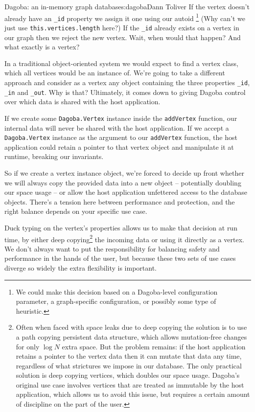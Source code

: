 \begin{aosachapter}{Dagoba: an in-memory graph database}{s:dagoba}{Dann Toliver}
If the vertex doesn't already have an \texttt{\_id} property we assign
it one using our autoid \footnote{We could make this decision based on a
  Dagoba-level configuration parameter, a graph-specific configuration,
  or possibly some type of heuristic.} (Why can't we just use
\texttt{this.vertices.length} here?) If the \texttt{\_id} already exists
on a vertex in our graph then we reject the new vertex. Wait, when would
that happen? And what exactly is a vertex?

In a traditional object-oriented system we would expect to find a vertex
class, which all vertices would be an instance of. We're going to take a
different approach and consider as a vertex any object containing the
three properties \texttt{\_id}, \texttt{\_in} and \texttt{\_out}. Why is
that? Ultimately, it comes down to giving Dagoba control over which data
is shared with the host application.

If we create some \texttt{Dagoba.Vertex} instance inside the
\texttt{addVertex} function, our internal data will never be shared with
the host application. If we accept a \texttt{Dagoba.Vertex} instance as
the argument to our \texttt{addVertex} function, the host application
could retain a pointer to that vertex object and manipulate it at
runtime, breaking our invariants.

So if we create a vertex instance object, we're forced to decide up
front whether we will always copy the provided data into a new object --
potentially doubling our space usage -- or allow the host application
unfettered access to the database objects. There's a tension here
between performance and protection, and the right balance depends on
your specific use case.

Duck typing on the vertex's properties allows us to make that decision
at run time, by either deep copying\footnote{Often when faced with space
  leaks due to deep copying the solution is to use a path copying
  persistent data structure, which allows mutation-free changes for only
  $\log{}N$ extra space. But the problem remains: if the host
  application retains a pointer to the vertex data then it can mutate
  that data any time, regardless of what strictures we impose in our
  database. The only practical solution is deep copying vertices, which
  doubles our space usage. Dagoba's original use case involves vertices
  that are treated as immutable by the host application, which allows us
  to avoid this issue, but requires a certain amount of discipline on
  the part of the user.} the incoming data or using it directly as a
vertex. We don't always want to put the responsibility for balancing
safety and performance in the hands of the user, but because these two
sets of use cases diverge so widely the extra flexibility is important.


\end{aosachapter}
